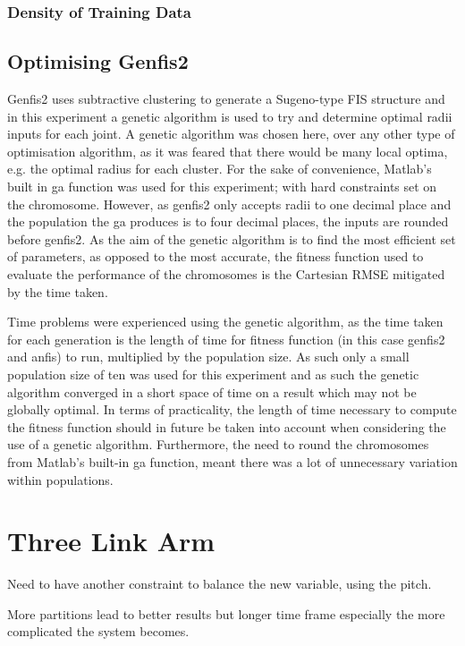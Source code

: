 \documentclass[11.5pt, twoside, a4paper]{article}
\begin{document}
\subsubsection{Density of Training Data}

\subsection{Optimising Genfis2}
Genfis2 uses subtractive clustering to generate a Sugeno-type FIS structure \cite{genfis2} and in this experiment a genetic algorithm is used to try and determine optimal radii inputs for each joint. A genetic algorithm was chosen here, over any other type of optimisation algorithm, as it was feared that there would be many local optima, e.g. the optimal radius for each cluster. For the sake of convenience, Matlab's built in ga function was used for this experiment; with hard constraints set on the chromosome. However, as genfis2 only accepts radii to one decimal place and the population the ga produces is to four decimal places, the inputs are rounded before genfis2. As the aim of the genetic algorithm is to find the most efficient set of parameters, as opposed to the most accurate, the fitness function used to evaluate the performance of the chromosomes is the Cartesian RMSE mitigated by the time taken.

Time problems were experienced using the genetic algorithm, as the time taken for each generation is the length of time for fitness function (in this case genfis2 and anfis) to run, multiplied by the population size. As such only a small population size of ten was used for this experiment and as such the genetic algorithm converged in a short space of time on a result which may not be globally optimal. In terms of practicality, the length of time necessary to compute the fitness function should in future be taken into account when considering the use of a genetic algorithm. Furthermore, the need to round the chromosomes from Matlab's built-in ga function, meant there was a lot of unnecessary variation within populations.

\section{Three Link Arm}

Need to have another constraint to balance the new variable, using the pitch.

More partitions lead to better results but longer time frame especially the more complicated the system becomes.
\end{document}
